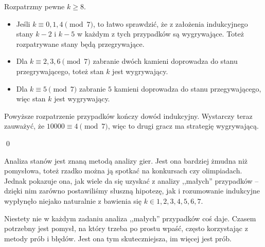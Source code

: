 \vspace{10px}
\noindent
Rozpatrzmy pewne $k \geqslant 8$.
\begin{itemize}
	\item Jeśli $k \equiv 0, 1, 4 \pmod{7}$, to łatwo sprawdzić, że z założenia indukcyjnego stany $k - 2$ i $k - 5$ w każdym z tych przypadków są wygrywające. Toteż rozpatrywane stany będą przegrywające.
	\item Dla $k \equiv 2, 3, 6 \pmod{7}$ zabranie dwóch kamieni doprowadza do stanu przegrywającego, toteż stan $k$ jest wygrywający.
	\item Dla $k \equiv 5 \pmod{7}$ zabranie $5$ kamieni doprowadza do stanu przegywającego, więc stan $k$ jest wygrywający. 
\end{itemize}
Powyższe rozpatrzenie przypadków kończy dowód indukcyjny.
Wystarczy teraz zauważyć, że $10000 \equiv 4 \pmod{7}$, więc to drugi gracz ma strategię wygrywającą.

\qed

\noindent
Analiza stanów jest znaną metodą analizy gier. Jest ona bardziej żmudna niż pomysłowa, toteż rzadko można ją spotkać na konkursach czy olimpiadach. Jednak pokazuje ona, jak wiele da się uzyskać z analizy ,,małych'' przypadków -- dzięki nim zarówno postawiliśmy słuszną hipotezę, jak i rozumowanie indukcyjne wypłynęło niejako naturalnie z bawienia się $k \in {1, 2, 3, 4, 5, 6, 7}$.


\vspace{10px}
\noindent
Niestety nie w każdym zadaniu analiza ,,małych'' przypadków coś daje. Czasem potrzebny jest pomysł, na który trzeba po prostu wpaść, często korzystając z metody prób i błędów. Jest ona tym skuteczniejsza, im więcej jest prób. 

